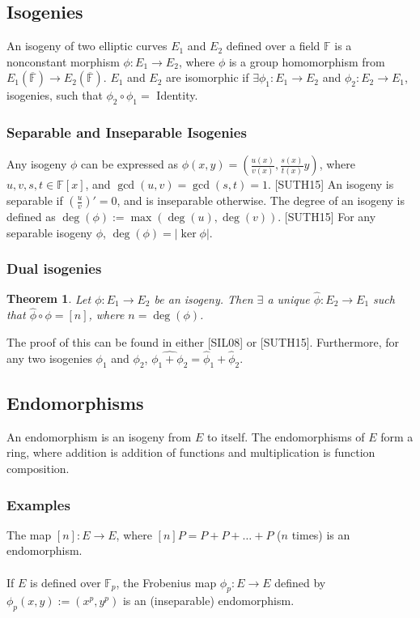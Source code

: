 \documentclass[12pt,twoside]{article}
\newcommand\abs[1]{\left|#1\right|}
\newtheorem{theorem}{Theorem}
\begin{document}
\subsection{Isogenies} 
An isogeny of two elliptic curves $E_1$ and $E_2$ defined over a field $\mathbb F$ is a nonconstant morphism $\phi: E_1 \to E_2$, where $\phi$ is a group homomorphism from $E_1(\overline{\mathbb F}) \to E_2(\overline{\mathbb F})$. $E_1$ and $E_2$ are isomorphic if $\exists \phi_1: E_1 \to E_2$ and $\phi_2: E_2 \to E_1$, isogenies, such that $\phi_2 \circ \phi_1 =  $ Identity.

\subsubsection{Separable and Inseparable Isogenies}
Any isogeny $\phi$ can be expressed as $\phi(x,y) = (\frac{u(x)}{v(x)}, \frac{s(x)}{t(x)}y)$, where $u,v,s,t \in \mathbb F[x]$, and $\gcd(u,v) = \gcd(s,t) = 1$. [SUTH15] %
An isogeny is separable if $(\frac{u}{v})' = 0$, and is inseparable otherwise. The degree of an isogeny is defined as $\deg(\phi) := \max(\deg(u), \deg(v))$. [SUTH15]
For any separable isogeny $\phi$, $\deg(\phi) = \abs{ \ker \phi}$.

\subsubsection{Dual isogenies}
\begin{theorem}
Let $\phi: E_1 \to E_2$ be an isogeny. Then $\exists$ a unique $\hat{\phi}: E_2 \to E_1$ such that $\hat \phi \circ \phi = [n]$, where $n = \deg(\phi)$.
\end{theorem}
\noindent The proof of this can be found in either [SIL08] or [SUTH15]. Furthermore, for any two isogenies $\phi_1$ and $\phi_2$, $\widehat{\phi_1 + \phi_2} = \hat \phi_1 + \hat \phi_2$.
\subsection{Endomorphisms}

An endomorphism is an isogeny from $E$ to itself. The endomorphisms of $E$ form a ring, where addition is addition of functions and multiplication is function composition.

\subsubsection{Examples}

The map $[n]: E \to E$, where $[n]P = P + P + \dots + P$ ($n$ times) is an endomorphism.
\\ \\
\noindent If $E$ is defined over $\mathbb F_p$, the Frobenius map $\phi_p: E \to E$ defined by $\phi_p(x,y) := (x^p, y^p)$ is an (inseparable) endomorphism.
\end{document}
